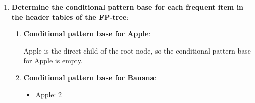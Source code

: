 \documentclass[
english,
smallborders
]{i6prcsht}
\begin{document}
\begin{solution}
\begin{enumerate}
\begin{enumerate}
\begin{center}
{
				            }
			            \end{center}

		      \end{enumerate}

		\item \textbf{Determine the conditional pattern base for each frequent item in the header tables of the FP-tree}:


		      \begin{enumerate}
			      \item \textbf{Conditional pattern base for Apple}:

			            Apple is the direct child of the root node, so the conditional pattern base for Apple is empty.

			      \item \textbf{Conditional pattern base for Banana}:

			            \begin{itemize}
				            \item Apple: 2
			            \end{itemize}


\end{enumerate}
\end{enumerate}
\end{solution}
\end{document}
